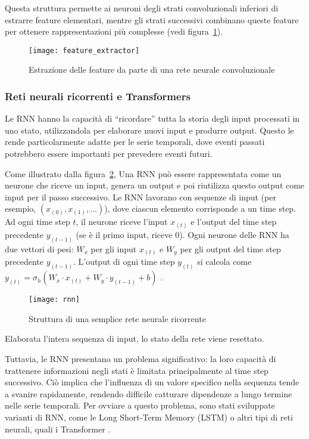 Questa struttura permette ai neuroni degli strati convoluzionali inferiori di
estrarre feature elementari, mentre gli strati successivi combinano queste
feature per ottenere rappresentazioni più complesse (vedi
figura~\ref{fig:feature_extractor}). 

\begin{figure}[!ht]
    \texttt{[image: feature\_extractor]}
    \caption{Estrazione delle feature da parte di una rete neurale convoluzionale \protect\cite{he2020}}
    \label{fig:feature_extractor}
\end{figure}

\subsubsection{Reti neurali ricorrenti e Transformers}

Le RNN hanno la capacità di ``ricordare'' tutta la storia degli input
processati in uno stato, utilizzandola per elaborare nuovi input e produrre
output. Questo le rende particolarmente adatte per le serie temporali, dove
eventi passati potrebbero essere importanti per prevedere eventi futuri.

Come illustrato dalla figura~\ref{fig:rnn}, Una RNN può essere rappresentata
come un neurone che riceve un input, genera un output e poi riutilizza questo
output come input per il passo successivo. Le RNN lavorano con sequenze di
input (per esempio, $(x_{(0)}, x_{(1)},\ldots)$), dove ciascun elemento
corrisponde a un time step. Ad ogni time step $t$, il neurone riceve l'input
$x_{(t)}$ e l'output del time step precedente $y_{(t-1)}$ (se è il primo
input, riceve 0). Ogni neurone delle RNN ha due vettori di pesi: $W_x$ per gli
input $x_{(t)}$ e $W_y$ per gli output del time step precedente $y_{(t-1)}$.
L'output di ogni time step $y_{(t)}$ si calcola come
$y_{(t)}=\sigma_h(W_x\cdot x_{(t)}+W_y\cdot y_{(t-1)}+b)$ \cite{geron2019}.

\begin{figure}[!ht]
    \centering
    \texttt{[image: rnn]}
    \caption{Struttura di una semplice rete neurale ricorrente \protect\cite{geron2019}}
    \label{fig:rnn}
\end{figure}

Elaborata l'intera sequenza di input, lo stato della rete viene resettato.

Tuttavia, le RNN presentano un problema significativo: la loro capacità di
trattenere informazioni negli stati è limitata principalmente al time step
successivo. Ciò implica che l'influenza di un valore specifico nella sequenza
tende a svanire rapidamente, rendendo difficile catturare dipendenze a lungo
termine nelle serie temporali. Per ovviare a questo problema, sono stati
sviluppate varianti di RNN, come le Long Short-Term Memory (LSTM)
\cite{hochreiter1997} o altri tipi di reti neurali, quali i Transformer
\cite{vaswani2023}.

